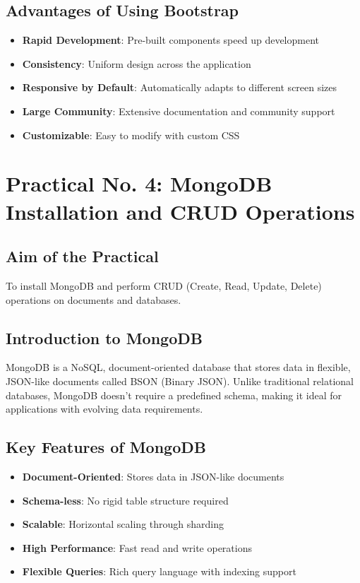 \documentclass[12pt,a4paper]{article}
\begin{document}
\subsection{Advantages of Using Bootstrap}

\begin{itemize}
    \item \textbf{Rapid Development}: Pre-built components speed up development
    \item \textbf{Consistency}: Uniform design across the application
    \item \textbf{Responsive by Default}: Automatically adapts to different screen sizes
    \item \textbf{Large Community}: Extensive documentation and community support
    \item \textbf{Customizable}: Easy to modify with custom CSS
\end{itemize}

\newpage

\section{Practical No. 4: MongoDB Installation and CRUD Operations}

\subsection{Aim of the Practical}
To install MongoDB and perform CRUD (Create, Read, Update, Delete) operations on documents and databases.

\subsection{Introduction to MongoDB}
MongoDB is a NoSQL, document-oriented database that stores data in flexible, JSON-like documents called BSON (Binary JSON). Unlike traditional relational databases, MongoDB doesn't require a predefined schema, making it ideal for applications with evolving data requirements.

\subsection{Key Features of MongoDB}
\begin{itemize}
    \item \textbf{Document-Oriented}: Stores data in JSON-like documents
    \item \textbf{Schema-less}: No rigid table structure required
    \item \textbf{Scalable}: Horizontal scaling through sharding
    \item \textbf{High Performance}: Fast read and write operations
    \item \textbf{Flexible Queries}: Rich query language with indexing support
\end{itemize}
\end{document}
